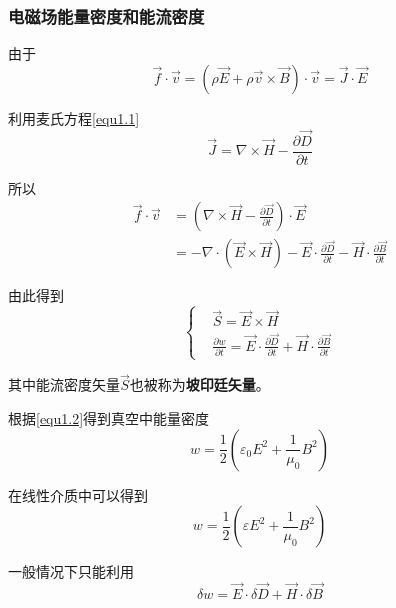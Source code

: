 \documentclass[UTF8]{ctexart}
\begin{document}
    \subsubsection{电磁场能量密度和能流密度}
    由于
    \begin{equation}
        \vec{f} \cdot \vec{v} = (\rho \vec{E} + \rho \vec{v} \times \vec{B}) \cdot \vec{v} = \vec{J} \cdot \vec{E}
    \end{equation}

\noindent 利用麦氏方程\autoref{equ1.1}
\begin{equation}
    \vec{J} = \nabla \times \vec{H} - \frac{\partial \vec{D}}{\partial t}
\end{equation}

\noindent 所以 
\begin{equation}
    \begin{aligned}
        \vec{f} \cdot \vec{v} &= (\nabla \times \vec{H} - \frac{\partial \vec{D}}{\partial t} )\cdot \vec{E} \\ 
        &=-\nabla \cdot (\vec{E} \times \vec{H}) - \vec{E} \cdot \frac{\partial \vec{D}}{\partial t} - \vec{H} \cdot \frac{\partial \vec{B}}{\partial t}
    \end{aligned}
\end{equation}

\noindent 由此得到
\begin{equation}
    \left \{ \begin{aligned}
        &\vec{S} = \vec{E} \times \vec{H} \\ 
        &\frac{\partial w}{\partial t} = \vec{E} \cdot \frac{\partial \vec{D}}{\partial t} + \vec{H} \cdot \frac{\partial \vec{B}}{\partial t}
    \end{aligned} \right. \label{equ1.2}
\end{equation}

\noindent 其中能流密度矢量$\vec{S}$也被称为\textbf{坡印廷矢量}。

    根据\autoref{equ1.2}得到真空中能量密度
    \begin{equation}
        w = \frac{1}{2} \left(\varepsilon_0 E^2 + \frac{1}{\mu_0}B^2 \right)
    \end{equation}

\noindent 在线性介质中可以得到
\begin{equation}
    w = \frac{1}{2}\left(\varepsilon E^2 + \frac{1}{\mu_0}B^2 \right)
\end{equation}

\noindent 一般情况下只能利用
\begin{equation}
    \delta w = \vec{E} \cdot \delta \vec{D} + \vec{H} \cdot \delta \vec{B}
\end{equation}
\end{document}
